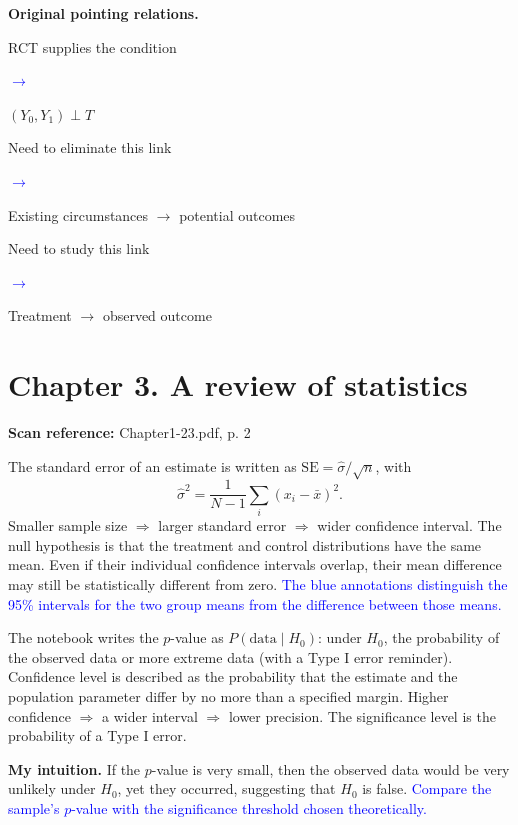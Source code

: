 \documentclass[11pt,a4paper]{article}
\newcommand{\sourcepages}[1]{\par{\small\sffamily\color{muted}\textbf{Scan reference:} #1\par}\nobreak\smallskip\nopagebreak[4]}
\newcommand{\inkblue}[1]{\textcolor{blue}{#1}}
\newcommand{\notearrow}[3]{%
\par\Needspace{6\baselineskip}\smallskip
\noindent\begin{minipage}[c]{0.43\linewidth}\raggedright\color{#1}#2\end{minipage}%
\hfill\textcolor{#1}{\(\longrightarrow\)}\hfill%
\begin{minipage}[c]{0.43\linewidth}\raggedright#3\end{minipage}\par\smallskip}
\begin{document}
{\par{}\smallskip\textbf{Original pointing relations.}\par\smallskip
\notearrow{blue}{RCT supplies the condition}{$(Y_0,Y_1)\perp T$}
\notearrow{blue}{Need to eliminate this link}{Existing circumstances $\longrightarrow$ potential outcomes}
\notearrow{blue}{Need to study this link}{Treatment $\longrightarrow$ observed outcome}
\section{Chapter 3. A review of statistics}
\sourcepages{Chapter1-23.pdf, p. 2}
The standard error of an estimate is written as $\mathrm{SE}=\hat\sigma/\sqrt n$, with
\[\hat\sigma^2=\frac{1}{N-1}\sum_i(x_i-\bar x)^2.\]
Smaller sample size $\Rightarrow$ larger standard error $\Rightarrow$ wider confidence interval. The null hypothesis is that the treatment and control distributions have the same mean. Even if their individual confidence intervals overlap, their mean difference may still be statistically different from zero. \inkblue{The blue annotations distinguish the 95\% intervals for the two group means from the difference between those means.}

The notebook writes the $p$-value as $P(\text{data}\mid H_0)$: under $H_0$, the probability of the observed data or more extreme data (with a Type I error reminder). Confidence level is described as the probability that the estimate and the population parameter differ by no more than a specified margin. Higher confidence $\Rightarrow$ a wider interval $\Rightarrow$ lower precision. The significance level is the probability of a Type I error.

\textbf{My intuition.} If the $p$-value is very small, then the observed data would be very unlikely under $H_0$, yet they occurred, suggesting that $H_0$ is false. \inkblue{Compare the sample's $p$-value with the significance threshold chosen theoretically.}

}
\end{document}
